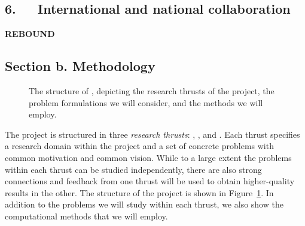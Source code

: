 \documentclass[a4paper,11pt]{article}
\begin{document}
\subsection*{6.~~~International and national collaboration}




\newpage
\begin{center}

{\LARGE\bf REBOUND} %
\end{center}

\subsection*{Section b. Methodology}

\begin{figure}[t]
\begin{center}
{\scalebox{0.96}{\small}}
\caption{\label{figure:structure}
The structure of {\acronym}, depicting the research thrusts of the project, 
the problem formulations we will consider, and the methods we will employ.}
\end{center}
\vspace{-4mm}
\end{figure}

The project is structured in three {\em research thrusts}:
\discover, \explore, and \recommend.
Each thrust specifies a research domain within the project
and a set of concrete problems with common motivation and common vision.
While to a large extent the problems within each thrust can be studied independently, 
there are also strong connections and feedback from one thrust will be used to obtain 
higher-quality results in the other.
The structure of the project is shown in Figure~\ref{figure:structure}.
In addition to the problems we will study within each thrust, 
we also show the computational methods that we will employ. 
\end{document}
